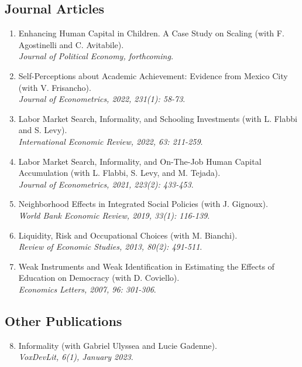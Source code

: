 \documentclass[12pt,english]{article}
\newcommand\reverselabel[1]{%
  \def\theenumi{}%
  \renewcommand\makelabel{\makebox[\dimexpr\labelwidth-3pt\relax][r]{%
    \the\numexpr#1-\value{enumi}+1\relax}}}%
\begin{document}
\subsection*{Journal Articles}
\begin{enumerate}
\reverselabel{7}
\item Enhancing Human Capital in Children. A Case Study on Scaling (with F. Agostinelli and C. Avitabile).\\ \textit{Journal of Political Economy, forthcoming.}
\item Self-Perceptions about Academic Achievement: Evidence from Mexico City (with V. Frisancho). \\
\textit{Journal of Econometrics, 2022, 231(1): 58-73}.  
\item  Labor Market Search, Informality, and Schooling Investments (with L. Flabbi and S. Levy). \\ \textit{International Economic Review, 2022, 63: 211-259}.  
\item  Labor Market Search, Informality, and On-The-Job Human Capital Accumulation (with L. Flabbi, S. Levy, and M. Tejada). \\ \textit{Journal of Econometrics, 2021, 223(2): 433-453}. 
\item Neighborhood Effects in Integrated Social Policies (with J. Gignoux). \\ \textit{World Bank Economic Review, 2019, 33(1): 116-139}.
\item Liquidity, Risk and Occupational Choices (with M. Bianchi). \\ \textit{Review of Economic Studies, 2013, 80(2): 491-511}.
\item Weak Instruments and Weak Identification in Estimating the Effects of Education on Democracy (with D. Coviello).\\ \textit{Economics Letters, 2007, 96: 301-306}.
\end{enumerate}


\subsection*{Other Publications}
\begin{enumerate}
\setcounter{enumi}{7}
\item Informality (with Gabriel Ulyssea and Lucie Gadenne). \\
\textit{VoxDevLit, 6(1), January 2023}.
\end{enumerate}
\end{document}
